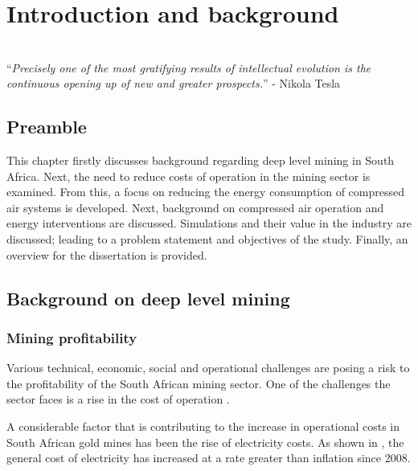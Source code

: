 \chapter{Introduction and background}  %
\thispagestyle{empty}
\vspace{38em}
\hrulefill
\\
\enquote{\textit{Precisely one of the most gratifying results of intellectual evolution is the continuous opening up of new and greater prospects.}} -  Nikola Tesla\\
\newpage

\section{Preamble}
This chapter firstly discusses background regarding deep level mining in South Africa. Next, the need to reduce costs of operation in the mining sector is examined. From this, a focus on reducing the energy consumption of compressed air systems is developed. Next, background on compressed air operation and energy interventions are discussed. Simulations and their value in the industry are discussed; leading to a problem statement and objectives of the study. Finally, an overview for the dissertation is provided.
\section{Background on deep level mining}
	\subsection{Mining profitability}
	
	 	Various technical, economic, social and operational challenges are posing a risk to the profitability of the South African mining sector. One of the challenges the sector faces is a rise in the cost of operation \cite{neingo2016trends}.
	 	\par
	 	
		A considerable factor that is contributing to the increase in operational costs in South African gold mines has been the rise of electricity costs. As shown in , the general cost of electricity has increased at a rate greater than inflation since 2008\footnotemark[1].
		
